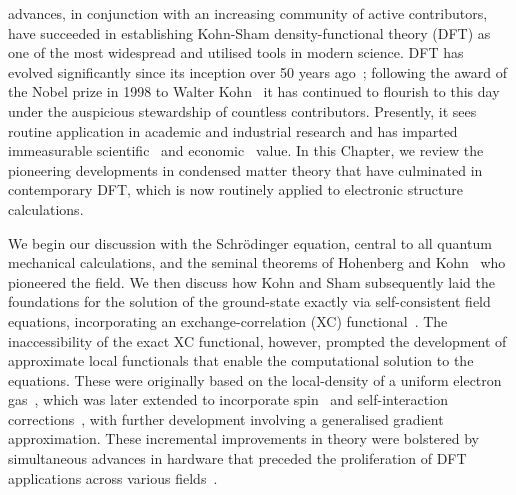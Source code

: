 
 advances, 
{
in conjunction with an \break 
increasing community of active contributors, 
have succeeded in establishing Kohn-Sham   
density-functional theory (DFT) as one of 
the most widespread and utilised tools 
in modern science.
%
{
DFT has evolved significantly 
since its inception over 50 years ago~\cite{doi:10.1063/1.4869598};
following the {award of the Nobel prize in 1998
to Walter Kohn}~\cite{RevModPhys.71.1253,RevModPhys.71.1267} 
it has continued to flourish to this day under 
the auspicious stewardship of countless contributors.
%
Presently, it sees routine application 
in academic and industrial research 
and has imparted immeasurable 
scientific~\cite{doi:10.1021/cr200107z, RevModPhys.87.897, doi:10.1063/1.4704546, doi:10.1146/annurev-physchem-032511-143803}
and economic~\cite{goldbeck2012economic} value.}
%
In this Chapter,
we review the pioneering developments 
in condensed matter theory that have culminated 
in contemporary DFT, which is now routinely applied 
to electronic structure calculations.}

We begin our discussion with the Schr\"odinger equation, 
central to all quantum mechanical calculations, 
and the seminal theorems of 
Hohenberg and Kohn~\cite{PhysRev.136.B864} 
who pioneered the field.
%
{
We then discuss how Kohn and Sham 
subsequently laid the foundations 
for the solution of the ground-state exactly 
via self-consistent field equations, 
incorporating an exchange-correlation (XC) functional~\cite{PhysRev.140.A1133}.
%
The inaccessibility of the exact XC functional, 
however, prompted the development of 
approximate local functionals  
that enable 
the computational solution to the equations.
%
These were originally based on the local-density 
of a uniform electron gas~\cite{PhysRev.140.A1133,PhysRevLett.45.566}, 
which was later extended to incorporate 
spin~\cite{0022-3719-5-13-012,PhysRevB.7.1912,PhysRevB.45.13244} 
and self-interaction corrections~\cite{PhysRevB.23.5048}, 
with further development involving a 
generalised gradient~\cite{PhysRevB.54.16533,PhysRevLett.77.3865} 
approximation.
%
These incremental improvements in theory  
were bolstered by simultaneous advances in hardware 
that {preceded} the proliferation of DFT applications 
across various fields~\cite{doi:10.1063/1.4704546,RevModPhys.61.689}.}

